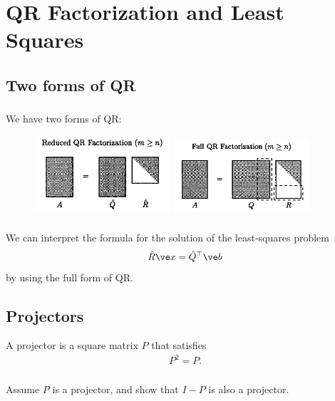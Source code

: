 \documentclass[11pt,letterpaper]{report}
\begin{document}
\chapter{QR Factorization and Least Squares}
\section{Two forms of QR}
\subsection{}
We have two forms of QR:
\begin{figure}[H]
    \centering
    \includegraphics[width = 0.45\textwidth]{Session_5/latex/figs/TB_reducedQR}
    \includegraphics[width = 0.45\textwidth]{Session_5/latex/figs/TB_fullQR}
\end{figure}

\subsection{}
We can interpret the formula for the solution of the least-squares problem
\begin{align*}
    \hat R \ve x = \hat Q^\top \ve b
\end{align*}
by using the full form of QR.

\section{Projectors}
A projector is a square matrix $P$ that satisfies
\begin{align*}
    P^2 = P.
\end{align*}

\subsection{}
Assume $P$ is a projector, and show that $I-P$ is also a projector.
\end{document}
